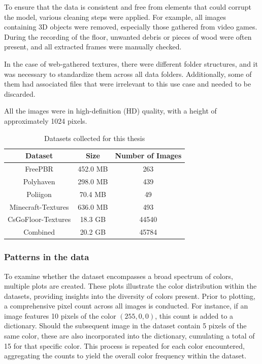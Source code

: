     To ensure that the data is consistent and free from elements that could corrupt the model, various cleaning steps were applied. For example, all images containing 3D objects were removed, especially those gathered from video games. During the recording of the floor, unwanted debris or pieces of wood were often present, and all extracted frames were manually checked.

    In the case of web-gathered textures, there were different folder structures, and it was necessary to standardize them across all data folders. Additionally, some of them had associated files that were irrelevant to this use case and needed to be discarded.

    All the images were in high-definition (HD) quality, with a height of approximately 1024 pixels.


    \begin{table}[h]
        \centering
        \begin{tabular}{|c|c|c|}
            \hline
            Dataset & Size & Number of Images \\
            \hline
            FreePBR & 452.0 MB & 263 \\
            Polyhaven & 298.0 MB & 439 \\
            Poliigon & 70.4 MB & 49 \\
            Minecraft-Textures &  636.0 MB & 493 \\
            CsGoFloor-Textures & 18.3 GB & 44540 \\
            \hline
            Combined & 20.2 GB & 45784 \\
            \hline
        \end{tabular}
        \caption{Datasets collected for this thesis}
        \label{tab:datasets}
    \end{table}

    \subsubsection{Patterns in the data}
    
    To examine whether the dataset encompasses a broad spectrum of colors, multiple plots are created. These plots illustrate the color distribution within the datasets, providing insights into the diversity of colors present. Prior to plotting, a comprehensive pixel count across all images is conducted. For instance, if an image features 10 pixels of the color $(255, 0, 0)$, this count is added to a dictionary. Should the subsequent image in the dataset contain 5 pixels of the same color, these are also incorporated into the dictionary, cumulating a total of 15 for that specific color. This process is repeated for each color encountered, aggregating the counts to yield the overall color frequency within the dataset.


